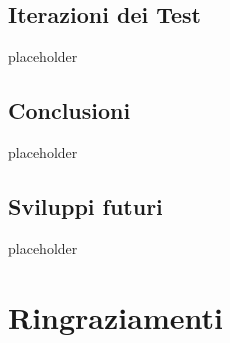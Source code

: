 \documentclass[a4paper,10pt]{memoir}
\begin{document}
\section{Iterazioni dei Test}

placeholder

\clearpage

\section{Conclusioni}

placeholder

\clearpage

\section{Sviluppi futuri}

placeholder

\clearpage


\chapter*{Ringraziamenti}

\cleardoublepage

\end{document}
